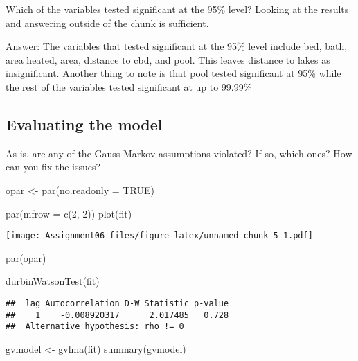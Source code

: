 \documentclass[
]{article}
\newenvironment{Shaded}{\begin{snugshade}}{\end{snugshade}}
\newcommand{\AttributeTok}[1]{\textcolor[rgb]{0.77,0.63,0.00}{#1}}
\newcommand{\ConstantTok}[1]{\textcolor[rgb]{0.00,0.00,0.00}{#1}}
\newcommand{\DecValTok}[1]{\textcolor[rgb]{0.00,0.00,0.81}{#1}}
\newcommand{\FunctionTok}[1]{\textcolor[rgb]{0.00,0.00,0.00}{#1}}
\newcommand{\NormalTok}[1]{#1}
\newcommand{\OtherTok}[1]{\textcolor[rgb]{0.56,0.35,0.01}{#1}}
\begin{document}
Which of the variables tested significant at the 95\% level? Looking at
the results and answering outside of the chunk is sufficient.

Answer: The variables that tested significant at the 95\% level include
bed, bath, area heated, area, distance to cbd, and pool. This leaves
distance to lakes as insignificant. Another thing to note is that pool
tested significant at 95\% while the rest of the variables tested
significant at up to 99.99\%

\hypertarget{evaluating-the-model}{%
\subsection{Evaluating the model}\label{evaluating-the-model}}

As is, are any of the Gauss-Markov assumptions violated? If so, which
ones? How can you fix the issues?

\begin{Shaded}
\begin{Highlighting}[]
\NormalTok{opar }\OtherTok{\textless{}{-}} \FunctionTok{par}\NormalTok{(}\AttributeTok{no.readonly =} \ConstantTok{TRUE}\NormalTok{)}

\FunctionTok{par}\NormalTok{(}\AttributeTok{mfrow =} \FunctionTok{c}\NormalTok{(}\DecValTok{2}\NormalTok{, }\DecValTok{2}\NormalTok{))}
\FunctionTok{plot}\NormalTok{(fit)}
\end{Highlighting}
\end{Shaded}

\texttt{[image: Assignment06\_files/figure-latex/unnamed-chunk-5-1.pdf]}

\begin{Shaded}
\begin{Highlighting}[]
\FunctionTok{par}\NormalTok{(opar)}

\FunctionTok{durbinWatsonTest}\NormalTok{(fit)}
\end{Highlighting}
\end{Shaded}

\begin{verbatim}
##  lag Autocorrelation D-W Statistic p-value
##    1    -0.008920317      2.017485   0.728
##  Alternative hypothesis: rho != 0
\end{verbatim}

\begin{Shaded}
\begin{Highlighting}[]
\NormalTok{gvmodel }\OtherTok{\textless{}{-}} \FunctionTok{gvlma}\NormalTok{(fit)}
\FunctionTok{summary}\NormalTok{(gvmodel)}
\end{Highlighting}
\end{Shaded}
\end{document}
